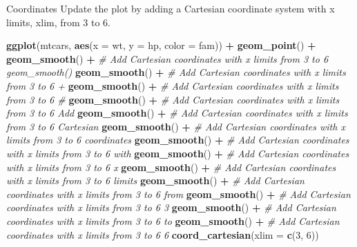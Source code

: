\documentclass[
  ignorenonframetext,
]{beamer}
\newenvironment{Shaded}{\begin{snugshade}}{\end{snugshade}}
\newcommand{\AttributeTok}[1]{\textcolor[rgb]{0.13,0.29,0.53}{#1}}
\newcommand{\CommentTok}[1]{\textcolor[rgb]{0.56,0.35,0.01}{\textit{#1}}}
\newcommand{\DecValTok}[1]{\textcolor[rgb]{0.00,0.00,0.81}{#1}}
\newcommand{\FunctionTok}[1]{\textcolor[rgb]{0.13,0.29,0.53}{\textbf{#1}}}
\newcommand{\NormalTok}[1]{#1}
\newcommand{\SpecialCharTok}[1]{\textcolor[rgb]{0.81,0.36,0.00}{\textbf{#1}}}
\begin{document}
\begin{frame}[fragile]{Coordinates}
\label{coordinates-8}
Update the plot by adding a Cartesian coordinate system with x limits,
xlim, from 3 to 6.


\begin{Shaded}
\begin{Highlighting}[]
\FunctionTok{ggplot}\NormalTok{(mtcars, }\FunctionTok{aes}\NormalTok{(}\AttributeTok{x =}\NormalTok{ wt, }\AttributeTok{y =}\NormalTok{ hp, }\AttributeTok{color =}\NormalTok{ fam)) }\SpecialCharTok{+} \FunctionTok{geom\_point}\NormalTok{() }\SpecialCharTok{+}
    \FunctionTok{geom\_smooth}\NormalTok{() }\SpecialCharTok{+} \CommentTok{\# Add Cartesian coordinates with x limits from 3 to 6 geom\_smooth()}
    \FunctionTok{geom\_smooth}\NormalTok{() }\SpecialCharTok{+} \CommentTok{\# Add Cartesian coordinates with x limits from 3 to 6 +}
    \FunctionTok{geom\_smooth}\NormalTok{() }\SpecialCharTok{+} \CommentTok{\# Add Cartesian coordinates with x limits from 3 to 6 \#}
    \FunctionTok{geom\_smooth}\NormalTok{() }\SpecialCharTok{+} \CommentTok{\# Add Cartesian coordinates with x limits from 3 to 6 Add}
    \FunctionTok{geom\_smooth}\NormalTok{() }\SpecialCharTok{+} \CommentTok{\# Add Cartesian coordinates with x limits from 3 to 6 Cartesian}
    \FunctionTok{geom\_smooth}\NormalTok{() }\SpecialCharTok{+} \CommentTok{\# Add Cartesian coordinates with x limits from 3 to 6 coordinates}
    \FunctionTok{geom\_smooth}\NormalTok{() }\SpecialCharTok{+} \CommentTok{\# Add Cartesian coordinates with x limits from 3 to 6 with}
    \FunctionTok{geom\_smooth}\NormalTok{() }\SpecialCharTok{+} \CommentTok{\# Add Cartesian coordinates with x limits from 3 to 6 x}
    \FunctionTok{geom\_smooth}\NormalTok{() }\SpecialCharTok{+} \CommentTok{\# Add Cartesian coordinates with x limits from 3 to 6 limits}
    \FunctionTok{geom\_smooth}\NormalTok{() }\SpecialCharTok{+} \CommentTok{\# Add Cartesian coordinates with x limits from 3 to 6 from}
    \FunctionTok{geom\_smooth}\NormalTok{() }\SpecialCharTok{+} \CommentTok{\# Add Cartesian coordinates with x limits from 3 to 6 3}
    \FunctionTok{geom\_smooth}\NormalTok{() }\SpecialCharTok{+} \CommentTok{\# Add Cartesian coordinates with x limits from 3 to 6 to}
    \FunctionTok{geom\_smooth}\NormalTok{() }\SpecialCharTok{+} \CommentTok{\# Add Cartesian coordinates with x limits from 3 to 6 6}
\FunctionTok{coord\_cartesian}\NormalTok{(}\AttributeTok{xlim =} \FunctionTok{c}\NormalTok{(}\DecValTok{3}\NormalTok{, }\DecValTok{6}\NormalTok{))}
\end{Highlighting}
\end{Shaded}


\end{frame}
\end{document}
